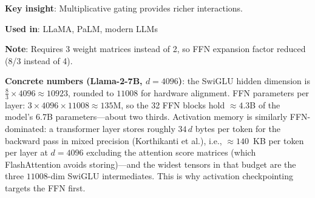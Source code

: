 \textbf{Key insight}: Multiplicative gating provides richer interactions.

\textbf{Used in}: LLaMA, PaLM, modern LLMs

\textbf{Note}: Requires 3 weight matrices instead of 2, so FFN expansion factor reduced (8/3 instead of 4).

\textbf{Concrete numbers (Llama-2-7B, $d = 4096$)}: the SwiGLU hidden dimension is $\frac{8}{3} \times 4096 \approx 10923$, rounded to $11008$ for hardware alignment. FFN parameters per layer: $3 \times 4096 \times 11008 \approx 135$M, so the 32 FFN blocks hold $\approx 4.3$B of the model's 6.7B parameters---about two thirds. Activation memory is similarly FFN-dominated: a transformer layer stores roughly $34\,d$ bytes per token for the backward pass in mixed precision (Korthikanti et al.), i.e., $\approx 140$~KB per token per layer at $d = 4096$ excluding the attention score matrices (which FlashAttention avoids storing)---and the widest tensors in that budget are the three $11008$-dim SwiGLU intermediates. This is why activation checkpointing targets the FFN first.


